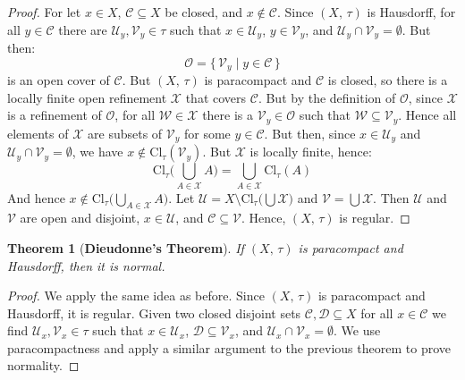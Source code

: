 \documentclass{article}
\theoremstyle{plain}
\newtheorem{theorem}{Theorem}[section]
\theoremstyle{normal}
\begin{document}
        \begin{proof}
            For let $x\in{X}$, $\mathcal{C}\subseteq{X}$ be closed, and
            $x\notin\mathcal{C}$. Since $(X,\,\tau)$ is Hausdorff, for all
            $y\in\mathcal{C}$ there are $\mathcal{U}_{y},\mathcal{V}_{y}\in\tau$
            such that $x\in\mathcal{U}_{y}$, $y\in\mathcal{V}_{y}$, and
            $\mathcal{U}_{y}\cap\mathcal{V}_{y}=\emptyset$. But then:
            \begin{equation}
                \mathcal{O}=\{\,\mathcal{V}_{y}\;|\;y\in\mathcal{C}\,\}
            \end{equation}
            is an open cover of $\mathcal{C}$. But $(X,\,\tau)$ is paracompact
            and $\mathcal{C}$ is closed, so there is a locally finite open
            refinement $\mathcal{X}$ that covers $\mathcal{C}$. But by the
            definition of $\mathcal{O}$, since $\mathcal{X}$ is a refinement of
            $\mathcal{O}$, for all $\mathcal{W}\in\mathcal{X}$ there is a
            $\mathcal{V}_{y}\in\mathcal{O}$ such that
            $\mathcal{W}\subseteq\mathcal{V}_{y}$. Hence all elements of
            $\mathcal{X}$ are subsets of $\mathcal{V}_{y}$ for some
            $y\in\mathcal{C}$. But then, since $x\in\mathcal{U}_{y}$ and
            $\mathcal{U}_{y}\cap\mathcal{V}_{y}=\emptyset$, we have
            $x\notin\textrm{Cl}_{\tau}(\mathcal{V}_{y})$. But
            $\mathcal{X}$ is locally finite, hence:
            \begin{equation}
                \textrm{Cl}_{\tau}\Big(\bigcup_{A\in\mathcal{X}}A\Big)
                =\bigcup_{A\in\mathcal{X}}\textrm{Cl}_{\tau}(A)
            \end{equation} 
            And hence
            $x\notin\textrm{Cl}_{\tau}\big(\bigcup_{A\in\mathcal{X}}A\big)$.
            Let
            $\mathcal{U}=X\setminus\textrm{Cl}_{\tau}\Big(\bigcup\mathcal{X}\Big)$
            and $\mathcal{V}=\bigcup\mathcal{X}$. Then $\mathcal{U}$ and
            $\mathcal{V}$ are open and disjoint, $x\in\mathcal{U}$, and
            $\mathcal{C}\subseteq\mathcal{V}$. Hence, $(X,\,\tau)$ is regular.
        \end{proof}
        \begin{theorem}[\textbf{Dieudonne's Theorem}]
            If $(X,\,\tau)$ is paracompact and Hausdorff, then it is normal.
        \end{theorem}
        \begin{proof}
            We apply the same idea as before. Since $(X,\,\tau)$ is paracompact
            and Hausdorff, it is regular. Given two closed disjoint sets
            $\mathcal{C},\mathcal{D}\subseteq{X}$ for all
            $x\in\mathcal{C}$ we find $\mathcal{U}_{x},\mathcal{V}_{x}\in\tau$
            such that $x\in\mathcal{U}_{x}$,
            $\mathcal{D}\subseteq\mathcal{V}_{x}$, and
            $\mathcal{U}_{x}\cap\mathcal{V}_{x}=\emptyset$. We use
            paracompactness and apply a similar argument to the previous theorem
            to prove normality.
        \end{proof}
\end{document}
